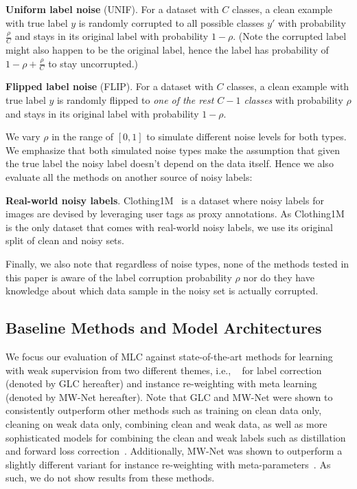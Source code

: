 \textbf{Uniform label noise} (\textsf{UNIF}). For a dataset with $C$
classes, a clean example with true label $y$ is randomly corrupted to all
possible classes $y'$ with  probability $\frac{\rho}{C}$ and stays in its original
label with probability $1-\rho$. (Note the corrupted label might also
happen to be the original label, hence the label has probability of
$1-\rho+\frac{\rho}{C}$ to stay uncorrupted.)

\textbf{Flipped label noise} (\textsf{FLIP}). For a dataset with $C$
classes, a clean example with true label $y$ is randomly flipped to
\textit{one of the rest $C-1$ classes} with probability $\rho$ and
stays in its original label with probability $1-\rho$.



We vary $\rho$ in the range of $[0,1]$ to simulate different noise
levels for both types. We emphasize that both simulated noise types
make the assumption that given the true label the noisy label doesn't
depend on the data itself. Hence we also evaluate all the methods on
another source of noisy labels:

\textbf{Real-world noisy labels}. Clothing1M~\cite{xiao2015learning} is a dataset where noisy labels for images are devised by leveraging user tags as proxy annotations.  As Clothing1M is the only dataset that comes with real-world noisy labels, we use its original split of clean and noisy sets.

Finally, we also note that regardless of noise types, none of the methods tested in this paper is aware of the label corruption probability $\rho$ nor do they have knowledge about which data sample in the noisy set is actually corrupted.


\subsection{Baseline Methods and Model Architectures}

We focus our evaluation of MLC against state-of-the-art
methods for learning with weak supervision from two different themes,
i.e., ~\cite{hendrycks2018using} for label correction (denoted by GLC
hereafter) and instance re-weighting with meta learning
~\cite{shu2019meta} (denoted by MW-Net hereafter). Note that GLC and MW-Net were shown to consistently outperform other methods such as training on clean data only, cleaning on weak data only, combining clean and weak data, as well as more sophisticated  models for combining the clean and weak labels such as distillation \cite{Li_2017_ICCV} and forward loss correction~\cite{sukhbaatar2014training}. Additionally,
MW-Net was shown to outperform a slightly different variant for
instance re-weighting with meta-parameters~\cite{ren2018learning}. As
such, we do not show results from these methods.


